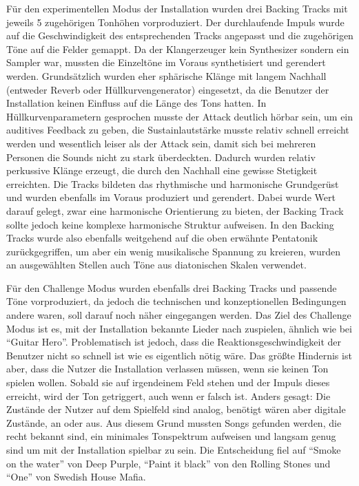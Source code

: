 Für den experimentellen Modus der Installation wurden drei Backing Tracks mit jeweils 5 zugehörigen Tonhöhen vorproduziert. Der durchlaufende Impuls wurde auf die Geschwindigkeit des entsprechenden Tracks angepasst und die zugehörigen Töne auf die Felder gemappt. Da der Klangerzeuger kein Synthesizer sondern ein Sampler war, mussten die Einzeltöne im Voraus synthetisiert und gerendert werden. Grundsätzlich wurden eher sphärische Klänge mit langem Nachhall (entweder Reverb oder Hüllkurvengenerator) eingesetzt, da die Benutzer der Installation keinen Einfluss auf die Länge des Tons hatten. In Hüllkurvenparametern gesprochen musste der Attack deutlich hörbar sein, um ein auditives Feedback zu geben, die Sustainlautstärke musste relativ schnell erreicht werden und wesentlich leiser als der Attack sein, damit sich bei mehreren Personen die Sounds nicht zu stark überdeckten. Dadurch wurden relativ perkussive Klänge erzeugt, die durch den Nachhall eine gewisse Stetigkeit erreichten. Die Tracks bildeten das rhythmische und harmonische Grundgerüst und wurden ebenfalls im Voraus produziert und gerendert. Dabei wurde Wert darauf gelegt, zwar eine harmonische Orientierung zu bieten, der Backing Track sollte jedoch keine komplexe harmonische Struktur aufweisen. In den Backing Tracks wurde also ebenfalls weitgehend auf die oben erwähnte Pentatonik zurückgegriffen, um aber ein wenig musikalische Spannung zu kreieren, wurden an ausgewählten Stellen auch Töne aus diatonischen Skalen verwendet.

Für den Challenge Modus wurden ebenfalls drei Backing Tracks und passende Töne vorproduziert, da jedoch die technischen und konzeptionellen Bedingungen andere waren, soll darauf noch näher eingegangen werden. Das Ziel des Challenge Modus ist es, mit der Installation bekannte Lieder nach zuspielen, ähnlich wie bei \enquote{Guitar Hero}. Problematisch ist jedoch, dass die Reaktionsgeschwindigkeit der Benutzer nicht so schnell ist wie es eigentlich nötig wäre. Das größte Hindernis ist aber, dass die Nutzer die Installation verlassen müssen, wenn sie keinen Ton spielen wollen. Sobald sie auf irgendeinem Feld stehen und der Impuls dieses erreicht, wird der Ton getriggert, auch wenn er falsch ist. Anders gesagt: Die Zustände der Nutzer auf dem Spielfeld sind analog, benötigt wären aber digitale Zustände, an oder aus. Aus diesem Grund mussten Songs gefunden werden, die recht bekannt sind, ein minimales Tonspektrum aufweisen und langsam genug sind um mit der Installation spielbar zu sein. Die Entscheidung fiel auf \enquote{Smoke on the water} von Deep Purple, \enquote{Paint it black} von den Rolling Stones und \enquote{One} von Swedish House Mafia.

